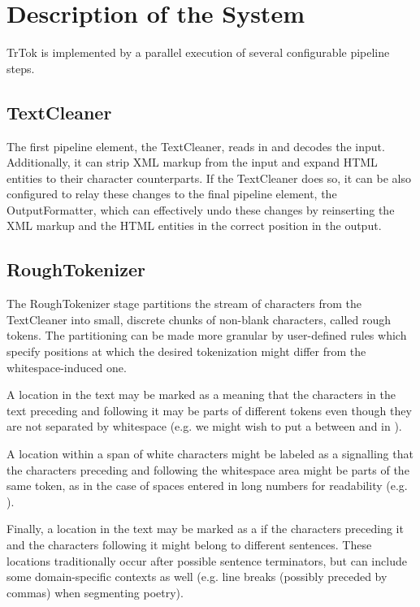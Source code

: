 \section{Description of the System}
\label{sec:system}

TrTok is implemented by a parallel execution of several configurable
pipeline steps.

\subsection{TextCleaner}

The first pipeline element, the TextCleaner, reads in and decodes the
input. Additionally, it can strip XML markup from the input and expand
HTML entities to their character counterparts. If the TextCleaner does
so, it can be also configured to relay these changes to the final
pipeline element, the OutputFormatter, which can effectively undo
these changes by reinserting the XML markup and the HTML entities in
the correct position in the output.

\subsection{RoughTokenizer}

The RoughTokenizer stage partitions the stream of characters from the
TextCleaner into small, discrete chunks of non-blank characters,
called rough tokens. The partitioning can be made more granular by
user-defined rules which specify positions at which the desired
tokenization might differ from the whitespace-induced one.

A location in the text may be marked as a \maysplit{} meaning that the
characters in the text preceding and following it may be parts of
different tokens even though they are not separated by whitespace
(e.g. we might wish to put a \maysplit{} between  and
 in ).

A location within a span of white characters might be labeled as a
\mayjoin{} signalling that the characters preceding and following the
whitespace area might be parts of the same token, as in the case of
spaces entered in long numbers for readability (e.g.
).

Finally, a location in the text may be marked as a \maybreaksentence{}
if the characters preceding it and the characters following it might
belong to different sentences. These locations traditionally occur
after possible sentence terminators, but can include some
domain-specific contexts as well (e.g. line breaks (possibly preceded
by commas) when segmenting poetry).

